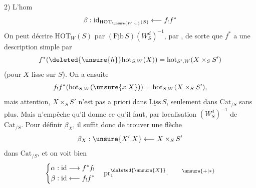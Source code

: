 2) L'hom
\[
 \beta:\mathrm{id}_{\mathrm{HOT}_{\unsure{W|w}}(S)}\longleftarrow f_!f^*
\]
On peut décrire $\mathrm{HOT}_W(S)$ par $(\underline{\mathrm{Fib}}\,S)(W_S^d)^{-1}$,  par , de sorte que $f^*$ a une description simple par
\[
 f^*(\deleted{\unsure{h}}\mathrm{hot}_{S,W}(X))=\mathrm{hot}_{S',W}(X\times_S S')
\]
(pour $X$ lisse sur $S$). On a ensuite
\[
 f_! f^*(\mathrm{hot}_{S,W}(\unsure{x|X}))=\mathrm{hot}_{S,W}(X\times_S S'),
\]
mais attention, $X\times_S S'$ n'est pas a priori dans $\underline{\mathrm{Liss}}\,S$, seulement dans $\mathrm{Cat}_{/S}$ sans plus. Mais  n'empêche qu'il donne ce qu'il faut, par localisation $(W_S^d)^{-1}$ de $\mathrm{Cat}_{/S}$. Pour définir $\beta_X$, il suffit donc de trouver une flèche
\[
 \beta_X:\unsure{X'|X}\longleftarrow X\times_S S'
\]
dans $\mathrm{Cat}_{/S}$, et on voit bien
\[
 \left\{\begin{aligned}
 \alpha &: \mathrm{id}\longrightarrow f^*f_!\\
 \beta &: \mathrm{id}\longleftarrow f_!f^*
 \end{aligned}\right.
 \quad\mathrm{pr}_1^{\deleted{\unsure{X}}}.\qquad{}^{\unsure{+|*}}
\]

